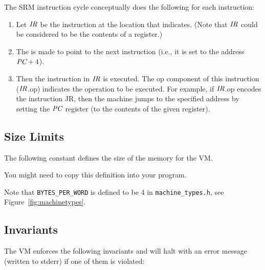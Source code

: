 \documentclass[11pt,letterpaper]{article}
\newcommand{\LSTCFILESLICE}[2]{

}
\newcommand{\figref}[1]{Figure~\ref{#1}}  %
\begin{document}
The SRM instruction cycle conceptually does the following for each
instruction:

\begin{enumerate}
\item
  Let $\textit{IR}$ be the instruction at the location that {\PC} indicates.
  (Note that $\textit{IR}$ could be considered to be the contents of a register.)

\item
  The {\PC} is made to point to the next instruction
  (i.e., it is set to the address $\textit{PC} + 4$).

\item
  Then the instruction in $\textit{IR}$ is executed.
  The op component of this instruction ($\textit{IR}$.op) indicates the operation
  to be executed.
  For example, if $\textit{IR}$.op encodes the instruction JR,
  then the machine jumps to the specified address by
  setting the $\textit{PC}$ register (to the contents of the given register).
\end{enumerate}

\subsection{Size Limits}

The following constant defines the size of the memory for the VM.

\LSTCFILESLICE{10-10}{machine.h}

You might need to copy this definition into your program.

Note that \lstinline!BYTES_PER_WORD! is defined to be 4 in
\lstinline!machine_types.h!, see \figref{fig:machinetypes}.

\subsection{Invariants}

The VM enforces the following invariants and will halt with an error
message (written to stderr) if one of them is violated:
\end{document}
